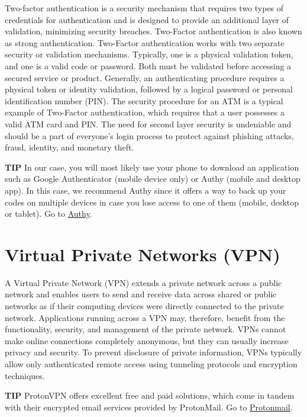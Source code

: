 Two-factor authentication is a security mechanism that requires two types of credentials for authentication and is designed to provide an additional layer of validation, minimizing security breaches. Two-Factor authentication is also known as strong authentication. Two-Factor authentication works with two separate security or validation mechanisms. Typically, one is a physical validation token, and one is a valid code or password. Both must be validated before accessing a secured service or product. Generally, an authenticating procedure requires a physical token or identity validation, followed by a logical password or personal identification number (PIN). The security procedure for an ATM is a typical example of Two-Factor authentication, which requires that a user possesses a valid ATM card and PIN. The need for second layer security is undeniable and should be a part of everyone's login process to protect against phishing attacks, fraud, identity, and monetary theft.
\medskip

    \begin{tipbox}{\textbf{TIP}}
        In our case, you will most likely use your phone to download an application such as Google Authenticator (mobile device only) or Authy (mobile and desktop app). In this case, we recommend Authy since it offers a way to back up your codes on multiple devices in case you lose access to one of them (mobile, desktop or tablet). 
        \tcblower
        Go to \href{https://authy.com/}{Authy}.
    \end{tipbox}

\section{Virtual Private Networks (VPN)}
A Virtual Private Network (VPN) extends a private network across a public network and enables users to send and receive data across shared or public networks as if their computing devices were directly connected to the private network. Applications running across a VPN may, therefore, benefit from the functionality, security, and management of the private network. VPNs cannot make online connections completely anonymous, but they can usually increase privacy and security. To prevent disclosure of private information, VPNs typically allow only authenticated remote access using tunneling protocols and encryption techniques.

    \bigskip
    \begin{tipbox}{\textbf{TIP}}
        ProtonVPN offers excellent free and paid solutions, which come in tandem with their encrypted email services provided by ProtonMail. \tcblower
        Go to \href{https://protonmail.com/}{Protonmail}.
    \end{tipbox}

